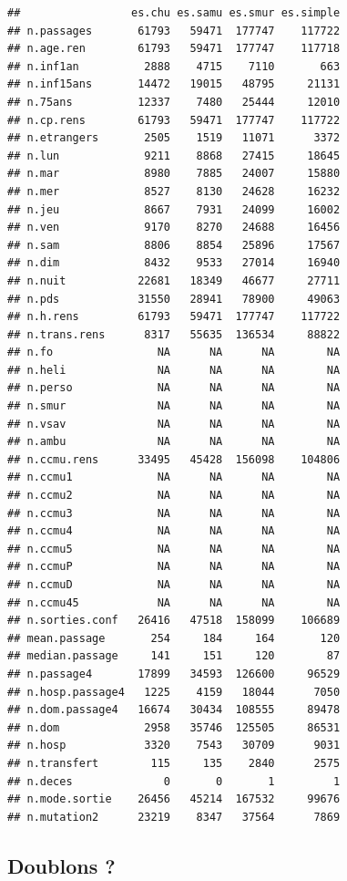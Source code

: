 \documentclass[]{article}
\begin{document}
\begin{verbatim}
##                 es.chu es.samu es.smur es.simple
## n.passages       61793   59471  177747    117722
## n.age.ren        61793   59471  177747    117718
## n.inf1an          2888    4715    7110       663
## n.inf15ans       14472   19015   48795     21131
## n.75ans          12337    7480   25444     12010
## n.cp.rens        61793   59471  177747    117722
## n.etrangers       2505    1519   11071      3372
## n.lun             9211    8868   27415     18645
## n.mar             8980    7885   24007     15880
## n.mer             8527    8130   24628     16232
## n.jeu             8667    7931   24099     16002
## n.ven             9170    8270   24688     16456
## n.sam             8806    8854   25896     17567
## n.dim             8432    9533   27014     16940
## n.nuit           22681   18349   46677     27711
## n.pds            31550   28941   78900     49063
## n.h.rens         61793   59471  177747    117722
## n.trans.rens      8317   55635  136534     88822
## n.fo                NA      NA      NA        NA
## n.heli              NA      NA      NA        NA
## n.perso             NA      NA      NA        NA
## n.smur              NA      NA      NA        NA
## n.vsav              NA      NA      NA        NA
## n.ambu              NA      NA      NA        NA
## n.ccmu.rens      33495   45428  156098    104806
## n.ccmu1             NA      NA      NA        NA
## n.ccmu2             NA      NA      NA        NA
## n.ccmu3             NA      NA      NA        NA
## n.ccmu4             NA      NA      NA        NA
## n.ccmu5             NA      NA      NA        NA
## n.ccmuP             NA      NA      NA        NA
## n.ccmuD             NA      NA      NA        NA
## n.ccmu45            NA      NA      NA        NA
## n.sorties.conf   26416   47518  158099    106689
## mean.passage       254     184     164       120
## median.passage     141     151     120        87
## n.passage4       17899   34593  126600     96529
## n.hosp.passage4   1225    4159   18044      7050
## n.dom.passage4   16674   30434  108555     89478
## n.dom             2958   35746  125505     86531
## n.hosp            3320    7543   30709      9031
## n.transfert        115     135    2840      2575
## n.deces              0       0       1         1
## n.mode.sortie    26456   45214  167532     99676
## n.mutation2      23219    8347   37564      7869
\end{verbatim}

\subsection{Doublons ?}\label{doublons}
\end{document}

